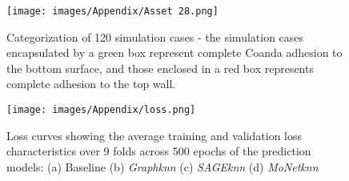 \appendix
\label{appendix}
\begin{figure}[ht]
    \centering
    \texttt{[image: images/Appendix/Asset 28.png]}
    \caption{Categorization of 120 simulation cases - the simulation cases encapsulated by a green box represent complete Coanda adhesion to the bottom surface, and those enclosed in a red box represents complete adhesion to the top wall.}
    \label{app}
    \end{figure}
\begin{figure}[ht]
    \centering
    \texttt{[image: images/Appendix/loss.png]}
    \caption{Loss curves showing the average training and validation loss characteristics over 9 folds across 500 epochs of the prediction models: (a) Baseline (b) \textit{Graphknn} (c) \textit{SAGEknn} (d) \textit{MoNetknn}}
    \label{loss}
    \end{figure}